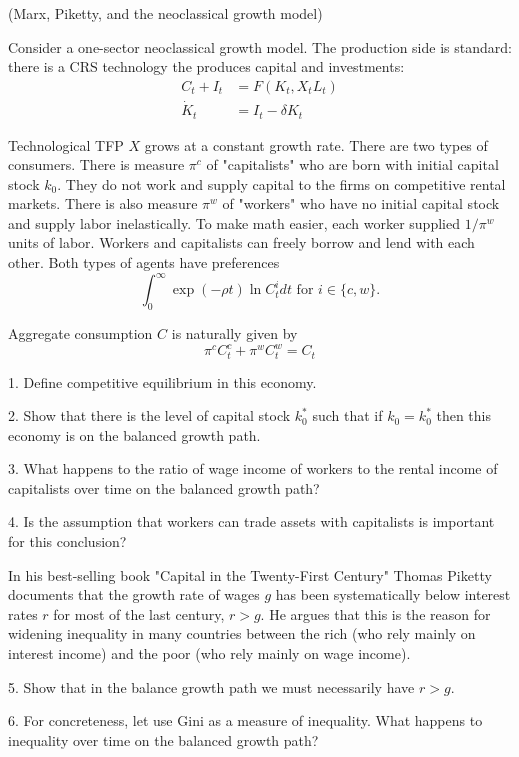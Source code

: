 (Marx, Piketty, and the neoclassical growth model)

Consider a one-sector neoclassical growth model. The production side is standard: there is a CRS technology the produces capital and investments:
$$
\begin{aligned}
C_t+I_t & =F\left(K_t, X_t L_t\right) \\
\dot{K}_t & =I_t-\delta K_t
\end{aligned}
$$

Technological TFP $X$ grows at a constant growth rate.
There are two types of consumers. There is measure $\pi^c$ of "capitalists" who are born with initial capital stock $k_0$. They do not work and supply capital to the firms on competitive rental markets. There is also measure $\pi^w$ of "workers" who have no initial capital stock and supply labor inelastically. To make math easier, each worker supplied $1 / \pi^w$ units of labor. Workers and capitalists can freely borrow and lend with each other. Both types of agents have preferences
$$
\int_0^{\infty} \exp (-\rho t) \ln C_t^i d t \text { for } i \in\{c, w\} .
$$

Aggregate consumption $C$ is naturally given by
$$
\pi^c C_t^c+\pi^w C_t^w=C_t
$$

1. Define competitive equilibrium in this economy.

2. Show that there is the level of capital stock $k_0^*$ such that if $k_0=k_0^*$ then this economy is on the balanced growth path.

3. What happens to the ratio of wage income of workers to the rental income of capitalists over time on the balanced growth path?

4. Is the assumption that workers can trade assets with capitalists is important for this conclusion?

In his best-selling book "Capital in the Twenty-First Century" Thomas Piketty documents that the growth rate of wages $g$ has been systematically below interest rates $r$ for most of the last century, $r>g$. He argues that this is the reason for widening inequality in many countries between the rich (who rely mainly on interest income) and the poor (who rely mainly on wage income).

5. Show that in the balance growth path we must necessarily have $r>g$.

6. For concreteness, let use Gini as a measure of inequality. What happens to inequality over time on the balanced growth path?


